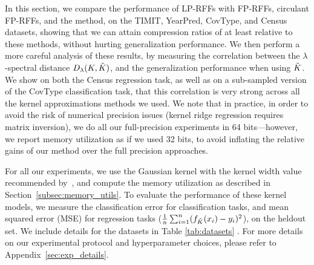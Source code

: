 In this section, we compare the performance of LP-RFFs with FP-RFFs, circulant FP-RFFs, and the \Nystrom method, on the TIMIT, YearPred, CovType, and Census datasets, showing that we can attain compression ratios of at least  relative to these methods, without hurting generalization performance. We then perform a more careful analysis of these results, by measuring the correlation between the $\lambda$-spectral distance $D_{\lambda}(K,\tilde{K})$, and the generalization performance when using $\tilde{K}$. We show on both the Census regression task, as well as on a sub-sampled version of the CovType classification task, that this correlation is very strong  across all the kernel approximations methods we used. 
We note that in practice, in order to avoid the risk of numerical precision issues (kernel ridge regression requires matrix inversion), we do all our full-precision experiments in 64 bits---however, we report memory utilization as if we used 32 bits, to avoid inflating the relative gains of our method over the full precision approaches.


For all our experiments, we use the Gaussian kernel with the kernel width value recommended by~\citet{may2017}, and compute the memory utilization as described in Section~\ref{subsec:memory_utils}. To evaluate the performance of these kernel models, we measure the classification error for classification tasks, and mean squared error (MSE) for regression tasks ($\frac{1}{n}\sum_{i=1}^n (f_{\tilde{K}}(x_i) - y_i)^2$), on the heldout set. We include details for the datasets in Table \ref{tab:datasets} . For more details on our experimental protocol and hyperparameter choices, please refer to Appendix~\ref{sec:exp_details}.

